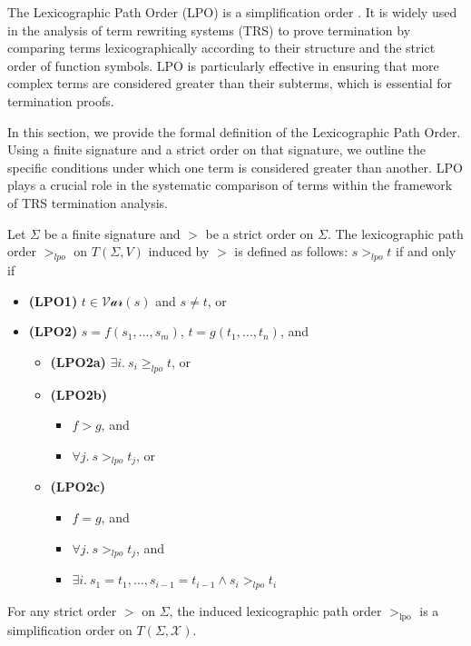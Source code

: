     The Lexicographic Path Order (LPO) \cite{dershowitz1982orderings} is a simplification order . It is widely used in the analysis of term rewriting systems (TRS) to prove termination by comparing terms lexicographically according to their structure and the strict order of function symbols. LPO is particularly effective in ensuring that more complex terms are considered greater than their subterms, which is essential for termination proofs.

In this section, we provide the formal definition of the Lexicographic Path Order. Using a finite signature and a strict order on that signature, we outline the specific conditions under which one term is considered greater than another. LPO plays a crucial role in the systematic comparison of terms within the framework of TRS termination analysis.
    
    \begin{definition}
    Let $\Sigma$ be a finite signature and $>$ be a strict order on $\Sigma$. The lexicographic path order $>_{lpo}$ on $T(\Sigma,V)$ induced by $>$ is defined as follows: \( s >_{lpo} t \) if and only if
    \begin{itemize}
        \item \textbf{(LPO1)} $t \mathop{\in} \mathcal{Var}(s)$ and $s \mathop{\neq} t$, or
        \item \textbf{(LPO2)} $s \mathop{=} f(s_1, \ldots, s_m)$, $t \mathop{=} g(t_1, \ldots, t_n)$, and
        \begin{itemize}
            \item \textbf{(LPO2a)} $\exists i.\ s_i \ge_{lpo} t$, or
            \item \textbf{(LPO2b)}
            \begin{itemize}
                \item $f \mathop{>} g$, and
                \item $\forall j.\ s >_{lpo} t_j$, or
            \end{itemize}
            \item \textbf{(LPO2c)}
            \begin{itemize}
                \item $f \mathop{=} g$, and
                \item $\forall j.\ s >_{lpo} t_j$, and
                \item $\exists i.\ s_1 \mathop{=} t_1, \ldots, s_{i-1} \mathop{=} t_{i-1} \mathop{\land} s_i >_{lpo} t_i$
            \end{itemize}
        \end{itemize}
    \end{itemize}
    \end{definition}
    
\begin{theorem}
    For any strict order $>$ on $\Sigma$, the induced lexicographic path order $>_{\text{lpo}}$ is a simplification order on $T(\Sigma, \mathcal{X})$.
\end{theorem}
